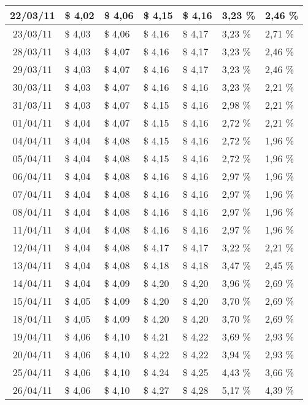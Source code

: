 \begin{center}
\begin{longtable}{|c|p{1.5cm}|p{1.5cm}|p{1.5cm}|p{1.5cm}|p{1.5cm}|p{1.5cm}|}
22/03/11 & \$ 4,02 & \$ 4,06 & \$ 4,15 & \$ 4,16 & 3,23 \% & 2,46 \% \\ \hline
23/03/11 & \$ 4,03 & \$ 4,06 & \$ 4,16 & \$ 4,17 & 3,23 \% & 2,71 \% \\ \hline
28/03/11 & \$ 4,03 & \$ 4,07 & \$ 4,16 & \$ 4,17 & 3,23 \% & 2,46 \% \\ \hline
29/03/11 & \$ 4,03 & \$ 4,07 & \$ 4,16 & \$ 4,17 & 3,23 \% & 2,46 \% \\ \hline
30/03/11 & \$ 4,03 & \$ 4,07 & \$ 4,16 & \$ 4,16 & 3,23 \% & 2,21 \% \\ \hline
31/03/11 & \$ 4,03 & \$ 4,07 & \$ 4,15 & \$ 4,16 & 2,98 \% & 2,21 \% \\ \hline
01/04/11 & \$ 4,04 & \$ 4,07 & \$ 4,15 & \$ 4,16 & 2,72 \% & 2,21 \% \\ \hline
04/04/11 & \$ 4,04 & \$ 4,08 & \$ 4,15 & \$ 4,16 & 2,72 \% & 1,96 \% \\ \hline
05/04/11 & \$ 4,04 & \$ 4,08 & \$ 4,15 & \$ 4,16 & 2,72 \% & 1,96 \% \\ \hline
06/04/11 & \$ 4,04 & \$ 4,08 & \$ 4,16 & \$ 4,16 & 2,97 \% & 1,96 \% \\ \hline
07/04/11 & \$ 4,04 & \$ 4,08 & \$ 4,16 & \$ 4,16 & 2,97 \% & 1,96 \% \\ \hline
08/04/11 & \$ 4,04 & \$ 4,08 & \$ 4,16 & \$ 4,16 & 2,97 \% & 1,96 \% \\ \hline
11/04/11 & \$ 4,04 & \$ 4,08 & \$ 4,16 & \$ 4,16 & 2,97 \% & 1,96 \% \\ \hline
12/04/11 & \$ 4,04 & \$ 4,08 & \$ 4,17 & \$ 4,17 & 3,22 \% & 2,21 \% \\ \hline
13/04/11 & \$ 4,04 & \$ 4,08 & \$ 4,18 & \$ 4,18 & 3,47 \% & 2,45 \% \\ \hline
14/04/11 & \$ 4,04 & \$ 4,09 & \$ 4,20 & \$ 4,20 & 3,96 \% & 2,69 \% \\ \hline
15/04/11 & \$ 4,05 & \$ 4,09 & \$ 4,20 & \$ 4,20 & 3,70 \% & 2,69 \% \\ \hline
18/04/11 & \$ 4,05 & \$ 4,09 & \$ 4,20 & \$ 4,20 & 3,70 \% & 2,69 \% \\ \hline
19/04/11 & \$ 4,06 & \$ 4,10 & \$ 4,21 & \$ 4,22 & 3,69 \% & 2,93 \% \\ \hline
20/04/11 & \$ 4,06 & \$ 4,10 & \$ 4,22 & \$ 4,22 & 3,94 \% & 2,93 \% \\ \hline
25/04/11 & \$ 4,06 & \$ 4,10 & \$ 4,24 & \$ 4,25 & 4,43 \% & 3,66 \% \\ \hline
26/04/11 & \$ 4,06 & \$ 4,10 & \$ 4,27 & \$ 4,28 & 5,17 \% & 4,39 \% \\ \hline

\end{longtable}
\end{center}
